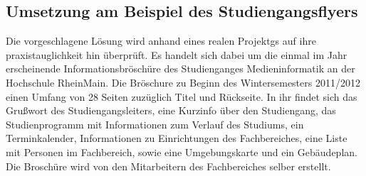 \subsection{Umsetzung am Beispiel des Studiengangsflyers}

Die vorgeschlagene Lösung wird anhand eines realen Projektgs auf ihre praxistauglichkeit hin überprüft. Es handelt sich dabei um die einmal im Jahr erscheinende Informationsbröschüre des Studienganges Medieninformatik an der Hochschule RheinMain. Die Bröschure zu Beginn des Wintersemesters 2011/2012 einen Umfang von 28 Seiten zuzüglich Titel und Rückseite. In ihr findet sich das Grußwort des Studiengangsleiters, eine Kurzinfo über den Studiengang, das Studienprogramm mit Informationen zum Verlauf des Studiums, ein Terminkalender, Informationen zu Einrichtungen des Fachbereiches, eine Liste mit Personen im Fachbereich, sowie eine Umgebungskarte und ein Gebäudeplan. Die Broschüre wird von den Mitarbeitern des Fachbereiches selber erstellt.

